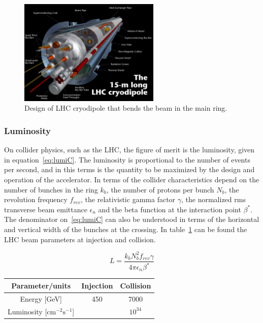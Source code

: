\begin{figure}[!Hhtbp]
  \begin{center}
    \includegraphics[width=0.6\textwidth]{figs/cryodipole.jpg}
    \caption{Design of LHC cryodipole that bends the beam in the main ring.}
    \label{fig:dipole}
  \end{center}
\end{figure}

\subsubsection{Luminosity}
\label{sec:lumi}

On collider physics, such as the LHC, the figure of merit is the luminosity, given in equation~\ref{eq:lumiC}. The luminosity is proportional to the number of events per second, and in this terms is the quantity to be maximized by the design and operation of the accelerator. In terms of the collider characteristics depend on the number of bunches in the ring $k_{b}$, the number of protons per bunch $N_{b}$, the revolution frequency $f_{rev}$, the relativistic gamma factor $\gamma$, the normalized rms transverse beam emittance $\epsilon_{n}$ and the beta function at the interaction point $\beta^{*}$. The denominator on~\ref{eq:lumiC} can also be understood in terms of the horizontal and vertical width of the bunches at the crossing. In table~\ref{tab:LHCparams} can be found the LHC beam parameters at injection and collision.  

\begin{equation}
  \label{eq:lumiC}
  L=\frac{k_{b}N_{b}^{2}f_{rev}\gamma}{4\pi\epsilon_{n}\beta^{*}}
\end{equation}

\begin{table}[htbH]
\label{tab:LHCparams}
\begin{center}
\begin{tabular}{|c|c c|}
\hline 
Parameter/units & Injection & Collision \\
\hline
Energy [GeV]& 450 & 7000 \\ 
Luminosity [$\text{cm}^{-2}\text{s}^{-1}$] & & $10^{34}$ \\
\hline
\end{tabular}
\end{center}
\end{table}

